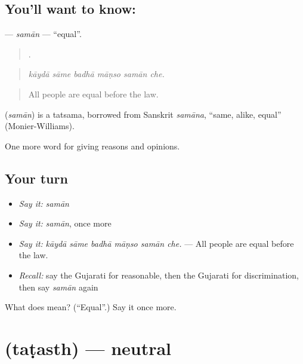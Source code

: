\subsection*{You'll want to know: }
\textbf{} — \emph{samān} — \textquotedblleft{}equal\textquotedblright{}.

\begin{quote}
     .
\end{quote}

\begin{quote}
\emph{kāydā sāme badhā māṇso samān che.}
\end{quote}

\begin{quote}
All people are equal before the law.
\end{quote}

\begin{cousinweb}
\textbf{} (\emph{samān}) is a tatsama, borrowed from Sanskrit \emph{samāna}, \textquotedblleft{}same, alike, equal\textquotedblright{} (Monier-Williams).
\end{cousinweb}

\begin{grammarlens}[title={What you've built}]
One more word for giving reasons and opinions.
\end{grammarlens}

\subsection*{Your turn}
\begin{itemize}
\raggedright
  \item \emph{Say it:} \emph{samān}
  \item \emph{Say it:} \emph{samān}, once more
  \item \emph{Say it:} \emph{kāydā sāme badhā māṇso samān che.} — All people are equal before the law.
  \item \emph{Recall:} say the Gujarati for reasonable, then the Gujarati for discrimination, then say \emph{samān} again
\end{itemize}

\begin{tcolorbox}[breakable,colback=teal!4,colframe=teal!35!black,title={Before you move on}]
What does  mean? (\textquotedblleft{}Equal\textquotedblright{}.) Say it once more.
\end{tcolorbox}
\section[\texorpdfstring{\gu{તટસ્થ} (taṭasth)}{તટસ્થ (taṭasth)}]{ (taṭasth) — neutral}

